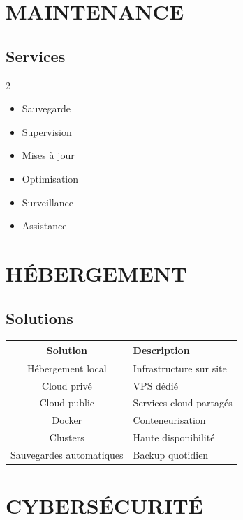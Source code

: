 \documentclass[12pt,a4paper,oneside]{book}
\begin{document}
\chapter{MAINTENANCE}

\section{Services}
\begin{multicols}{2}
\begin{itemize}
\item Sauvegarde
\item Supervision
\item Mises à jour
\item Optimisation
\item Surveillance
\item Assistance
\end{itemize}
\end{multicols}

\chapter{HÉBERGEMENT}

\section{Solutions}
\begin{center}
\begin{tabular}{|c|p{10cm}|}
\hline
\rowcolor{electronblue}
\color{white}\textbf{Solution} & \color{white}\textbf{Description} \\
\hline
Hébergement local & Infrastructure sur site \\
\hline
Cloud privé & VPS dédié \\
\hline
Cloud public & Services cloud partagés \\
\hline
Docker & Conteneurisation \\
\hline
Clusters & Haute disponibilité \\
\hline
Sauvegardes automatiques & Backup quotidien \\
\hline
\end{tabular}
\end{center}

\chapter{CYBERSÉCURITÉ}
\end{document}
